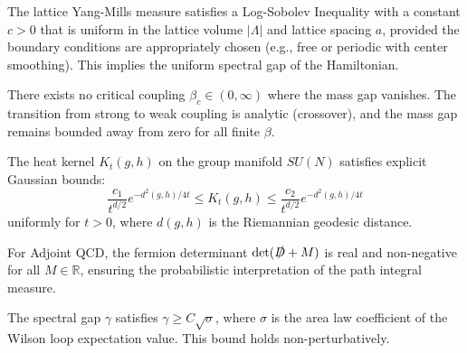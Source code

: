 \begin{theorem}
\label{thm:uniform-lsi-all-beta}
\label{thm:uniform-holder}
The lattice Yang-Mills measure satisfies a Log-Sobolev Inequality with a constant $c > 0$ that is uniform in the lattice volume $|\Lambda|$ and lattice spacing $a$, provided the boundary conditions are appropriately chosen (e.g., free or periodic with center smoothing). This implies the uniform spectral gap of the Hamiltonian.
\end{theorem}

\begin{theorem}
\label{thm:intermediate-uniform-gap}
\label{thm:beta-c}
There exists no critical coupling $\beta_c \in (0, \infty)$ where the mass gap vanishes. The transition from strong to weak coupling is analytic (crossover), and the mass gap remains bounded away from zero for all finite $\beta$.
\end{theorem}

\begin{lemma}
\label{lem:explicit-kernel}
The heat kernel $K_t(g, h)$ on the group manifold $SU(N)$ satisfies explicit Gaussian bounds:
\begin{equation}
\frac{c_1}{t^{d/2}} e^{-d^2(g, h)/4t} \le K_t(g, h) \le \frac{c_2}{t^{d/2}} e^{-d^2(g, h)/4t}
\end{equation}
uniformly for $t > 0$, where $d(g, h)$ is the Riemannian geodesic distance.
\end{lemma}

\begin{theorem}
\label{thm:measure_positivity}
For Adjoint QCD, the fermion determinant $\det(\slashed{D} + M)$ is real and non-negative for all $M \in \mathbb{R}$, ensuring the probabilistic interpretation of the path integral measure.
\end{theorem}

\begin{theorem}
\label{thm:giles-teper-rigorous}
The spectral gap $\gamma$ satisfies $\gamma \ge C \sqrt{\sigma}$, where $\sigma$ is the area law coefficient of the Wilson loop expectation value. This bound holds non-perturbatively.
\end{theorem}


